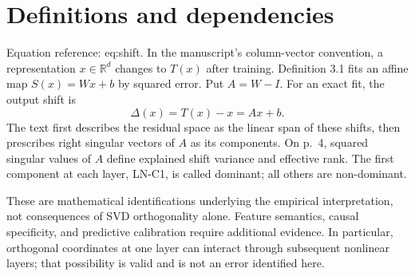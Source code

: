 \documentclass[10pt]{article}
\begin{document}
\section*{Definitions and dependencies}
Equation reference: eq:shift. In the manuscript’s column-vector convention, a representation \(x\in\mathbb R^d\) changes to \(T(x)\) after training. Definition 3.1 fits an affine map \(S(x)=Wx+b\) by squared error. Put \(A=W-I\). For an exact fit, the output shift is \[
\Delta(x)=T(x)-x=Ax+b.\] The text first describes the residual space as the linear span of these shifts, then prescribes right singular vectors of \(A\) as its components. On p. 4, squared singular values of \(A\) define explained shift variance and effective rank. The first component at each layer, LN-C1, is called dominant; all others are non-dominant.\par
These are mathematical identifications underlying the empirical interpretation, not consequences of SVD orthogonality alone. Feature semantics, causal specificity, and predictive calibration require additional evidence. In particular, orthogonal coordinates at one layer can interact through subsequent nonlinear layers; that possibility is valid and is not an error identified here.\par
\end{document}
